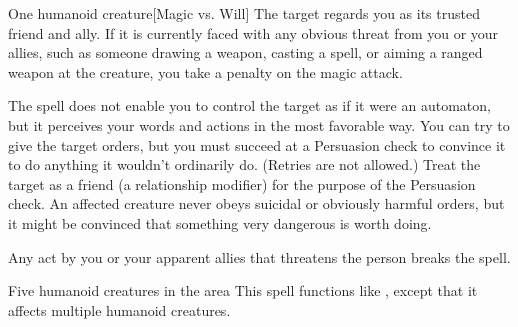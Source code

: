 \spellrng{\rngmed}
\spelldur{\durlong}
\begin{spelltarget}{One humanoid creature}[Magic vs. Will]
    \spellsuccess The target regards you as its trusted friend and ally. If it is currently faced with any obvious threat from you or your allies, such as someone drawing a weapon, casting a spell, or aiming a ranged weapon at the creature, you take a  penalty on the magic attack.
    \par The spell does not enable you to control the target as if it were an automaton, but it perceives your words and actions in the most favorable way. You can try to give the target orders, but you must succeed at a Persuasion check to convince it to do anything it wouldn't ordinarily do. (Retries are not allowed.) Treat the target as a friend (a  relationship modifier) for the purpose of the Persuasion check. An affected creature never obeys suicidal or obviously harmful orders, but it might be convinced that something very dangerous is worth doing.
\end{spelltarget}
\spellnotes Any act by you or your apparent allies that threatens the  person breaks the spell.

\norepeatspellnotes

\begin{spelltargets}{Five humanoid creatures in the area}
    \spellsuccess This spell functions like , except that it affects multiple humanoid creatures.
\end{spelltargets}

